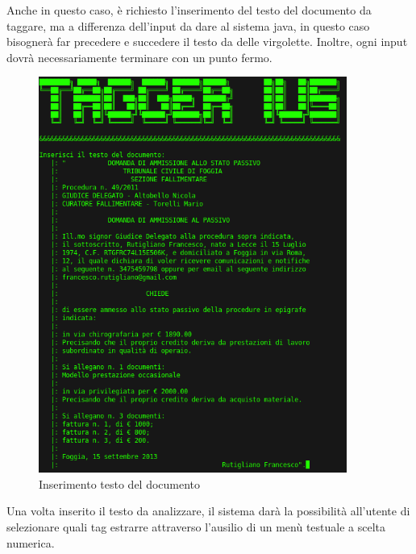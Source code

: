 Anche in questo caso, è richiesto l'inserimento del testo del documento da taggare, ma a differenza dell'input da dare al sistema java, in questo caso bisognerà far precedere e succedere il testo da delle virgolette.
Inoltre, ogni input dovrà necessariamente terminare con un punto fermo.

\begin{figure}[H]
	\centering
	\includegraphics[width=0.9\textwidth]{img/interfaces/CLI-document.png}
	\caption[Schermata CLI document]{Inserimento testo del documento}
	\label{CLI-doc}
\end{figure}

Una volta inserito il testo da analizzare, il sistema darà la possibilità all'utente di selezionare quali tag estrarre attraverso l'ausilio di un menù testuale a scelta numerica.

